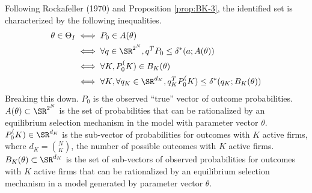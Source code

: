 Following Rockafeller (1970) and Proposition \ref{prop:BK-3}, the identified set is characterized by the following inequalities.
\begin{equation}
	\label{eq:BK-7}
	\begin{split}
	 	\theta \in \Theta_I &\iff P_0 \in A(\theta) \\ 
	 	&\iff \forall q\in \SR^{2^N}, q^T P_0 \leq \delta^*(a;A(\theta)) \\
	 	&\iff \forall K, P_0^\PK \in B_K(\theta) \\
	 	&\iff \forall K, \forall q_K \in \SR^{d_K}, q_K^T P_0^\PK \leq \delta^*(q_K;B_K(\theta))
	 \end{split} 	
\end{equation} 
Breaking this down. $P_0$ is the observed ``true'' vector of outcome probabilities. \(A(\theta) \subset \SR^{2^N}\) is the set of probabilities that can be rationalized by an equilibrium selection mechanism in the model with parameter vector $\theta$. $P_0^\PK \in \SR^{d_K}$ is the sub-vector of probabilities for outcomes with $K$ active firms, where $d_K = \binom{N}{K}$, the number of possible outcomes with $K$ active firms. $B_K(\theta) \subset \SR^{d_K}$ is the set of sub-vectors of observed probabilities for outcomes with $K$ active firms that can be rationalized by an equilibrium selection mechanism in a model generated by parameter vector $\theta$.

